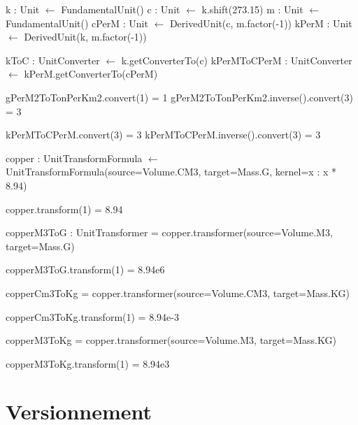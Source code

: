 \documentclass[a4paper,twoside,10pt]{article}
\begin{document}
\begin{algorithm}[!h]
\caption{Test d'unités dérivées (transformations affines)}\label{affineDerivedTest}
\begin{algorithmic}

\State k : Unit $\gets$ FundamentalUnit()
\State c : Unit $\gets$ k.shift(273.15)
\State m : Unit $\gets$ FundamentalUnit()
\State cPerM : Unit $\gets$ DerivedUnit(c, m.factor(-1))
\State kPerM : Unit $\gets$ DerivedUnit(k, m.factor(-1))

\State kToC : UnitConverter $\gets$ k.getConverterTo(c)
\State kPerMToCPerM : UnitConverter $\gets$ kPerM.getConverterTo(cPerM)

\Require gPerM2ToTonPerKm2.convert(1) = 1
\Require gPerM2ToTonPerKm2.inverse().convert(3) = 3

\Require kPerMToCPerM.convert(3) = 3
\Require kPerMToCPerM.inverse().convert(3) = 3
\EndProcedure
\end{algorithmic}
\end{algorithm}

\begin{algorithm}[!h]
\caption{Test des transformations d'unités}\label{unitTransformerTest}
\begin{algorithmic}

\State copper : UnitTransformFormula $\gets$ UnitTransformFormula(source=Volume.CM3, target=Mass.G, kernel=x : x * 8.94)

\Require copper.transform(1) = 8.94

\State copperM3ToG : UnitTransformer = copper.transformer(source=Volume.M3, target=Mass.G)

\Require copperM3ToG.transform(1) = 8.94e6

\State copperCm3ToKg = copper.transformer(source=Volume.CM3, target=Mass.KG)

\Require copperCm3ToKg.transform(1) = 8.94e-3

\State copperM3ToKg = copper.transformer(source=Volume.M3, target=Mass.KG)

\Require copperM3ToKg.transform(1) = 8.94e3
\EndProcedure
\end{algorithmic}
\end{algorithm}

\section{Versionnement}
\end{document}

